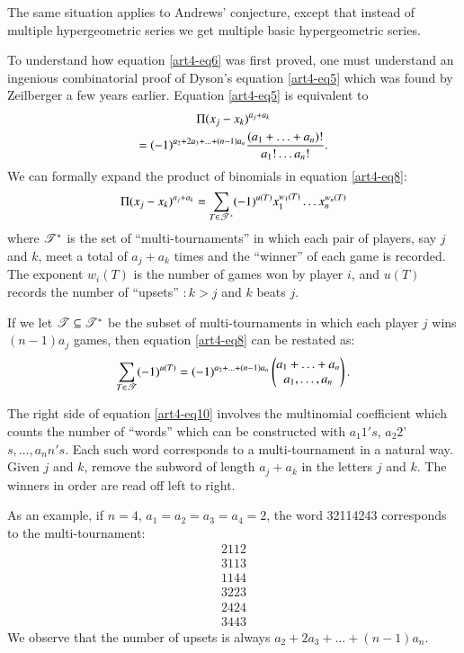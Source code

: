 The same situation applies to Andrews' conjecture, except that instead of multiple hypergeometric series we get multiple basic hypergeometric series. 

To understand how equation \eqref{art4-eq6} was first proved, one must understand an ingenious combinatorial  proof of Dyson's equation \eqref{art4-eq5} which was found by Zeilberger \cite{art4-key24} a few years earlier. Equation \eqref{art4-eq5} is equivalent to 
\begin{gather}
[(x^{a_1}_1 \ldots x^{a_n}_n)^{n-1}] \Pi (x_j - x_k)^{a_j+a_k} \label{art4-eq8} \\
= (-1)^{a_2 + 2a_3 + \ldots  + (n-1) a_n} \frac{(a_1+ \ldots + a_n)!}{a_1 !\ldots a_n!}. \notag
\end{gather}\pageoriginale 
We can formally expand the product of binomials in equation \eqref{art4-eq8}:
\begin{equation}
\Pi (x_j - x_k)^{a_j+ a_k} = \sum\limits_{T \in \mathscr{T}^\ast} (-1)^{u(T)} x_1^{w_1 (T)} \ldots x_n^{w_n(T)} \label{art4-eq9}
\end{equation}
where $\mathscr{T}^\ast$ is the set of ``multi-tournaments'' in which each pair of players, say $j$ and $k$, meet a total of $a_j + a_k $ times and the ``winner'' of each game is recorded. The exponent $w_i (T)$ is the number of games won by player $i$, and $u(T)$ records the number of ``upsets'' $: k > j$ and $k$ beats $j$.

If we let $\mathscr{T} \subseteq \mathscr{T}^\ast$ be the subset of multi-tournaments in which each player $j$ wins $(n-1)a_j$ games,  then equation \eqref{art4-eq8} can be restated as:
\begin{equation}
\sum\limits_{T \in \mathscr{T}} (-1)^{u(T)} = (-1)^{a_2 + \ldots + (n-1) a_n} 
\begin{pmatrix}
a_1 + \ldots + a_n\\
a_1, \ldots, a_n \end{pmatrix}. \label{art4-eq10}
\end{equation}

The right side of equation \eqref{art4-eq10} involves the multinomial coefficient which counts the number of ``words'' which can be constructed with $a_1 1's$, $a_2 2$' $s, \ldots, a_n n's$. Each such word corresponds to a multi-tourna\-ment in a natural way. Given $j$ and $k$, remove the subword of length $a_j + a_k$ in the letters $j$ and $k$. The winners in order are read off left to right. 

As an example, if $n = 4$, $a_1 =a_2 = a_3 =a_4 =2$, the word 32114243 corresponds to the multi-tournament:
\begin{align*}
2112\\
3113\\
1144\\
3223\\
2424\\
3443
\end{align*}
We observe that the number of upsets is always $a_2 +2a_3 + \ldots + (n-1)a_n$.

